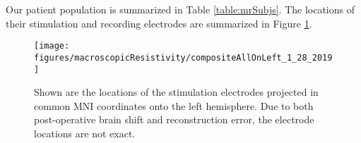 Our  patient population is summarized in Table \ref{table:mrSubjs}. The locations of their stimulation and recording electrodes are summarized in Figure \ref{fig:mrCompositeBrain}.

\begin{figure}[ht]
	\centering
	\texttt{[image: figures/macroscopicResistivity/compositeAllOnLeft\_1\_28\_2019]}
	\caption[Stimulation electrode locations]{Shown are the locations of the stimulation electrodes projected in common MNI coordinates onto the left hemisphere. Due to both post-operative brain shift and reconstruction error, the electrode locations are not exact.}
	\label{fig:mrCompositeBrain}
\end{figure}
%

